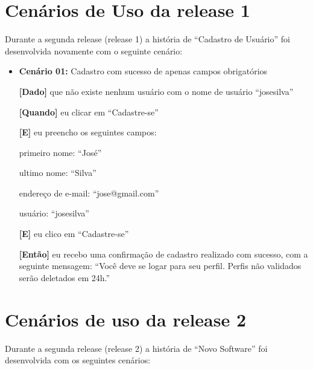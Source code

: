 \section{Cenários de Uso da release 1}
\label{cenario_r1}


Durante a segunda release (release 1) a história de ``Cadastro de Usuário'' foi desenvolvida novamente com o seguinte cenário:

\begin{itemize}
\item\textbf{Cenário 01:} Cadastro com sucesso de apenas campos obrigatórios

    \textbf{[Dado]} que não existe nenhum usuário com o nome de usuário ``josesilva''

    \textbf{[Quando]} eu clicar em ``Cadastre-se''

    \textbf{[E]} eu preencho os seguintes campos: 

        \subitem primeiro nome: ``José''

        \subitem ultimo nome: ``Silva''

        \subitem endereço de e-mail: ``jose@gmail.com''

        \subitem usuário: ``josesilva''
        
    \textbf{[E]} eu clico em ``Cadastre-se''

    \textbf{[Então]} eu recebo uma confirmação de cadastro realizado com sucesso, com a seguinte mensagem: 
    ``Você deve se logar para seu perfil. Perfis não validados serão deletados em 24h.''
\end{itemize}

\section{Cenários de uso da release 2}
\label{cenario_r2}

Durante a segunda release (release 2) a história de ``Novo Software'' foi desenvolvida com os seguintes cenários:

